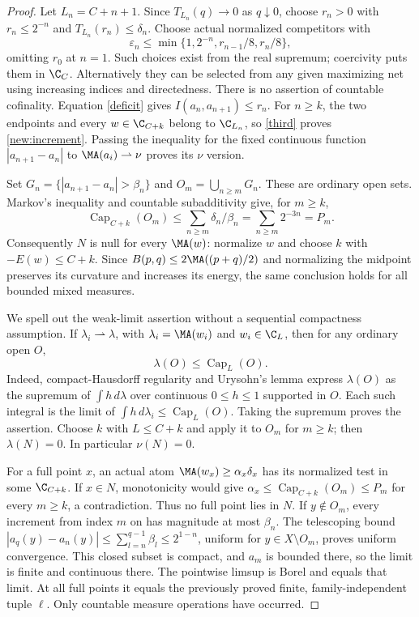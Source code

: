 \begin{proof}
Let $L_n=C+n+1$. Since $T_{L_n}(q)\to0$ as $q\downarrow0$, choose
$r_n>0$ with $r_n\le2^{-n}$ and $T_{L_n}(r_n)\le\delta_n$.
Choose actual normalized competitors with
\[
 \varepsilon_n\le\min\{1,2^{-n},r_{n-1}/8,r_n/8\},
\]
omitting $r_0$ at $n=1$. Such choices exist from the real supremum;
coercivity puts them in $\C_C$. Alternatively they can be selected
from any given maximizing net using increasing indices and directedness.
There is no assertion of countable cofinality. Equation \eqref{deficit}
gives $I(a_n,a_{n+1})\le r_n$. For $n\ge k$, the two endpoints and
every $w\in\C_{C+k}$ belong to $\C_{L_n}$, so \eqref{third} proves
\eqref{new:increment}. Passing the inequality for the fixed continuous
function $|a_{n+1}-a_n|$ to $\MA(a_i)\rightharpoonup\nu$ proves its
$\nu$ version.

Set $G_n=\{|a_{n+1}-a_n|>\beta_n\}$ and
$O_m=\bigcup_{n\ge m}G_n$. These are ordinary open sets. Markov's
inequality and countable subadditivity give, for $m\ge k$,
\[
 \operatorname{Cap}_{C+k}(O_m)
 \le\sum_{n\ge m}\delta_n/\beta_n
 =\sum_{n\ge m}2^{-3n}=P_m.
\]
Consequently $N$ is null for every $\MA(w)$: normalize $w$ and choose
$k$ with $-E(w)\le C+k$. Since
$B(p,q)\le2\MA((p+q)/2)$ and normalizing the midpoint preserves its
curvature and increases its energy, the same conclusion holds for
all bounded mixed measures.

We spell out the weak-limit assertion without a sequential compactness
assumption. If $\lambda_i\rightharpoonup\lambda$, with
$\lambda_i=\MA(w_i)$ and $w_i\in\C_L$, then for any ordinary open
$O$,
\[
 \lambda(O)\le\operatorname{Cap}_L(O).
\]
Indeed, compact-Hausdorff regularity and Urysohn's lemma express
$\lambda(O)$ as the supremum of $\int h\,d\lambda$ over continuous
$0\le h\le1$ supported in $O$. Each such integral is the limit of
$\int h\,d\lambda_i\le\operatorname{Cap}_L(O)$. Taking the supremum
proves the assertion. Choose $k$ with $L\le C+k$ and apply it to
$O_m$ for $m\ge k$; then $\lambda(N)=0$. In particular $\nu(N)=0$.

For a full point $x$, an actual atom
$\MA(w_x)\ge\alpha_x\delta_x$ has its normalized test in some
$\C_{C+k}$. If $x\in N$, monotonicity would give
$\alpha_x\le\operatorname{Cap}_{C+k}(O_m)\le P_m$ for every
$m\ge k$, a contradiction. Thus no full point lies in $N$.
If $y\notin O_m$, every increment from index $m$ on has magnitude
at most $\beta_n$. The telescoping bound
$|a_q(y)-a_n(y)|\le\sum_{l=n}^{q-1}\beta_l\le2^{1-n}$,
uniform for $y\in X\setminus O_m$, proves uniform convergence.
This closed subset is compact, and $a_m$ is bounded there, so the limit
is finite and continuous there. The pointwise limsup is Borel and
equals that limit. At all full points it equals the previously proved
finite, family-independent tuple $\ell$. Only countable measure
operations have occurred.
\end{proof}

